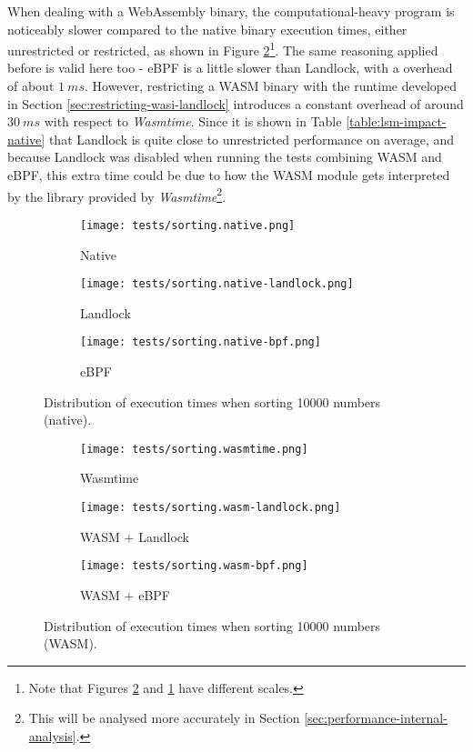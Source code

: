 When dealing with a WebAssembly binary, the computational-heavy program is noticeably slower
compared to the native binary execution times, either unrestricted or restricted, as shown in Figure
\ref{fig:distribution-sorting-wasm}\footnote{Note that Figures \ref{fig:distribution-sorting-wasm} and \ref{fig:distribution-sorting-native}
have different scales.}.
The same reasoning applied before is valid here too - eBPF is a little slower than Landlock, with a overhead
of about $1\ ms$.
However, restricting a WASM binary with the runtime developed in Section \ref{sec:restricting-wasi-landlock}
introduces a constant overhead of around $30\ ms$ with respect to \textit{Wasmtime}.
Since it is shown in Table \ref{table:lsm-impact-native} that Landlock is quite close to
unrestricted performance on average, and because Landlock was disabled when running
the tests combining WASM and eBPF, this extra time could be due to how the WASM module gets
interpreted by the library provided by \textit{Wasmtime}\footnote{This will be analysed more
accurately in Section \ref{sec:performance-internal-analysis}.}.

\begin{figure}[ht]
  \centering
  \begin{subfigure}[b]{0.32\textwidth}
    \centering
    \texttt{[image: tests/sorting.native.png]}
    \caption{Native}
  \end{subfigure}
  \begin{subfigure}[b]{0.32\textwidth}
    \centering
    \texttt{[image: tests/sorting.native-landlock.png]}
    \caption{Landlock}
  \end{subfigure}
  \begin{subfigure}[b]{0.32\textwidth}
    \centering
    \texttt{[image: tests/sorting.native-bpf.png]}
    \caption{eBPF}
  \end{subfigure}
  \caption{Distribution of execution times when sorting 10000 numbers (native).}
  \label{fig:distribution-sorting-native}
\end{figure}

\begin{figure}[ht!]
  \centering
  \begin{subfigure}[b]{0.32\textwidth}
    \centering
    \texttt{[image: tests/sorting.wasmtime.png]}
    \caption{Wasmtime}
  \end{subfigure}
  \begin{subfigure}[b]{0.32\textwidth}
    \centering
    \texttt{[image: tests/sorting.wasm-landlock.png]}
    \caption{WASM + Landlock}
  \end{subfigure}
  \begin{subfigure}[b]{0.32\textwidth}
    \centering
    \texttt{[image: tests/sorting.wasm-bpf.png]}
    \caption{WASM + eBPF}
  \end{subfigure}
  \caption{Distribution of execution times when sorting 10000 numbers (WASM).}
  \label{fig:distribution-sorting-wasm}
\end{figure}


